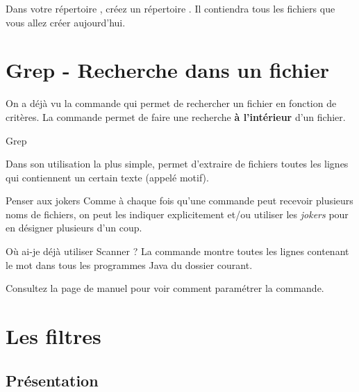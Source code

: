 \documentclass[a4paper,11pt]{style-esi/td}
\begin{document}
\entete
\titre
{}
\lastedit

\bigskip
\tableofcontents

\vfill
\begin{infobox}
    Dans votre répertoire , 
	créez un répertoire . 
    Il contiendra tous les fichiers que vous allez créer aujourd'hui. 
\end{infobox}
\vfill

\newpage

\section{Grep - Recherche dans un fichier}

	On a déjà vu la commande 
	qui permet de rechercher un fichier en fonction de critères.
	La commande  permet de faire une recherche 
	\textbf{à l'intérieur} d'un fichier.

	\begin{theorie}{Grep}

		\medskip
		Dans son utilisation la plus simple, 
		permet d’extraire de fichiers 
		toutes les lignes qui contiennent un certain texte 
		(appelé motif).
	\end{theorie}

	\begin{infotbox}{Penser aux jokers}
		Comme à chaque fois qu'une commande peut recevoir plusieurs noms de fichiers,
		on peut les indiquer explicitement et/ou utiliser les \emph{jokers}
		pour en désigner plusieurs d'un coup.
	\end{infotbox}

	\begin{Exemple}{Où ai-je déjà utiliser Scanner ?}
		La commande  montre toutes les lignes
		contenant le mot 
		dans tous les programmes Java du dossier courant.
	\end{Exemple}

	Consultez la page de manuel pour voir comment paramétrer la commande.

\section{Les filtres}

	\subsection{Présentation}
\end{document}
